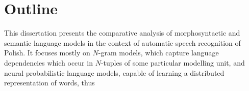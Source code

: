 \FloatBarrier
\section{Outline}
\label{section:outline}
This dissertation presents the comparative analysis of morphosyntactic and semantic language models in the context of automatic speech recognition of Polish. It focuses mostly on $N$-gram models, which capture language dependencies which occur in $N$-tuples of some particular modelling unit, and neural probabilistic language models, capable of learning a distributed representation of words, thus
